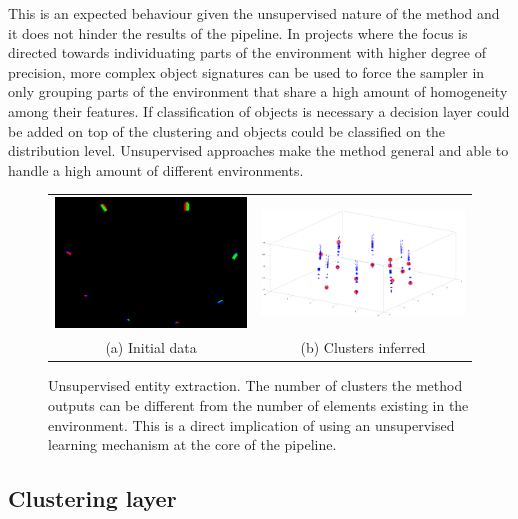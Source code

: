 \documentclass [twoside,hidelinks]{article}
\begin{document}
This is an expected behaviour given the unsupervised nature of the method and it does not hinder the results of the pipeline. In projects where the focus is directed towards individuating parts of the environment with higher degree of precision, more complex object signatures can be used to force the sampler in only grouping parts of the environment that share a high amount of homogeneity among their features. If classification of objects is necessary a decision layer could be added on top of the clustering and objects could be classified on the distribution level. Unsupervised approaches make the method general and able to handle a high amount of different environments. 


\begin{figure} [!ht]
\begin{tabular}{cc}
    \includegraphics [width=.5\textwidth]{8boxesData} &  \includegraphics [width=.5\textwidth]{8boxes} \\
   (a) Initial data  &  (b) Clusters inferred \\ [6pt]
\end{tabular}
\caption{Unsupervised entity extraction. The number of clusters the method outputs can be different from the number of elements existing in the environment. This is a direct implication of using an unsupervised learning mechanism at the core of the pipeline.}
  \label{pip:beh}
\end{figure}


\subsection{Clustering layer}
\end{document}
